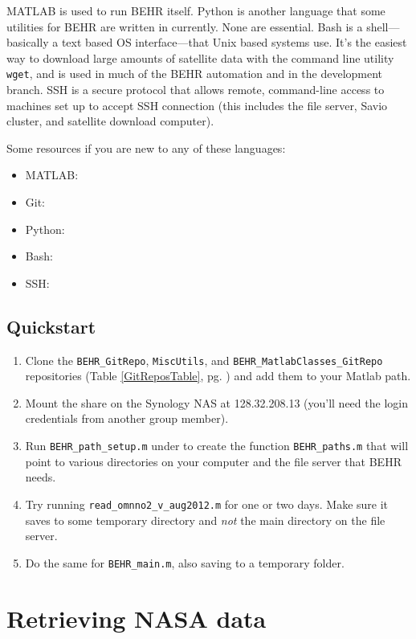 \documentclass[12pt]{article}
\begin{document}
	MATLAB is used to run BEHR itself. Python is another language that some utilities for BEHR are written in currently. None are essential. Bash is a shell---basically a text based OS interface---that Unix based systems use. It's the easiest way to download large amounts of satellite data with the command line utility \texttt{wget}, and is used in much of the BEHR automation and in the development branch. SSH is a secure protocol that allows remote, command-line access to machines set up to accept SSH connection (this includes the file server, Savio cluster, and satellite download computer).
	
	Some resources if you are new to any of these languages:
	\begin{itemize}
		\item MATLAB:
		\item Git:
		\item Python:
		\item Bash:
		\item SSH:
	\end{itemize}
	
	\subsection{Quickstart}
	\begin{enumerate}
	\item Clone the \lstinline$BEHR_GitRepo$, \lstinline$MiscUtils$, and \lstinline$BEHR_MatlabClasses_GitRepo$ repositories (Table \ref{GitReposTable}, pg. \pageref{GitReposTable}) and add them to your Matlab path.
	\item Mount the  share on the Synology NAS at 128.32.208.13 (you'll need the login credentials from another group member).
	\item Run \lstinline$BEHR_path_setup.m$ under  to create the function \lstinline$BEHR_paths.m$ that will point to various directories on your computer and the file server that BEHR needs.
	\item Try running \lstinline$read_omnno2_v_aug2012.m$ for one or two days. Make sure it saves to some temporary directory and \emph{not} the main  directory on the file server.
	\item Do the same for \lstinline$BEHR_main.m$, also saving to a temporary folder.
	\end{enumerate}

\section{Retrieving NASA data}
\end{document}
